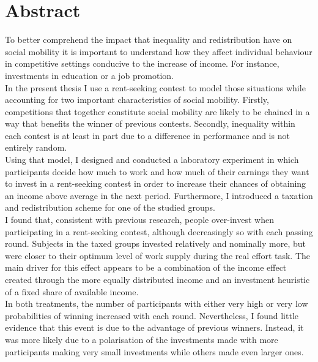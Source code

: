 \chapter*{Abstract}

\begin{small}
To better comprehend the impact that inequality and redistribution have on social mobility it is important to understand how they affect individual behaviour in competitive settings conducive to the increase of income. For instance, investments in education or a job promotion.\\

In the present thesis I use a rent-seeking contest to model those situations while accounting for two important characteristics of social mobility. Firstly, competitions that together constitute social mobility are likely to be chained in a way that benefits the winner of previous contests. Secondly, inequality within each contest is at least in part due to a difference in performance and is not entirely random.\\

Using that model, I designed and conducted a laboratory experiment in which participants decide how much to work and how much of their earnings they want to invest in a rent-seeking contest in order to increase their chances of obtaining an income above average in the next period. Furthermore, I introduced a taxation and redistribution scheme for one of the studied groups.\\

I found that, consistent with previous research, people over-invest when participating in a rent-seeking contest, although decreasingly so with each passing round. Subjects in the taxed groups invested relatively and nominally more, but were closer to their optimum level of work supply during the real effort task. The main driver for this effect appears to be a combination of the income effect created through the more equally distributed income and an investment heuristic of a fixed share of available income.\\

In both treatments, the number of participants with either very high or very low probabilities of winning increased with each round. Nevertheless, I found little evidence that this event is due to the advantage of previous winners. Instead, it was more likely due to a polarisation of the investments made with more participants making very small investments while others made even larger ones.\\


\end{small}
